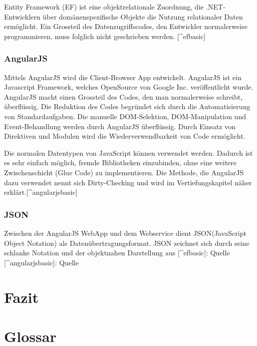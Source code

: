 Entity Framework (EF) ist eine objektrelationale Zuordnung, die
.NET-Entwicklern über domänenspezifische Objekte die Nutzung
relationaler Daten ermöglicht. Ein Grossteil des Datenzugriffscodes, den
Entwickler normalerweise programmieren, muss folglich nicht geschrieben
werden. {[}\^{}efbasic{]}

\subsection{AngularJS}\label{angularjs}

Mittels AngularJS wird die Client-Browser App entwickelt. AngularJS ist
ein Javascript Framework, welches OpenSource von Google Inc.
veröffentlicht wurde. AngularJS macht einen Grossteil des Codes, den man
normalerweise schreibt, überflüssig. Die Reduktion des Codes begründet
sich durch die Automatisierung von Standardaufgaben. Die manuelle
DOM-Selektion, DOM-Manipulation und Event-Behandlung werden durch
AngularJS überflüssig. Durch Einsatz von Direktiven und Modulen wird die
Wiederverwendbarkeit von Code ermöglicht.

Die normalen Datentypen von JavaScript können verwendet werden. Dadurch
ist es sehr einfach möglich, fremde Bibliotheken einzubinden, ohne eine
weitere Zwischenschicht (Glue Code) zu implementieren. Die Methode, die
AngularJS dazu verwendet nennt sich Dirty-Checking und wird im
Vertiefungskapitel näher erklärt.{[}\^{}angularjsbasic{]}

\subsection{JSON}\label{json}

Zwischen der AngularJS WebApp und dem Webservice dient JSON(JavaScript
Object Notation) als Datenübertragungsformat. JSON zeichnet sich durch
seine schlanke Notation und der objektnahen Darstellung aus
{[}\^{}efbasic{]}: Quelle \autocite{efbasic} {[}\^{}angularjsbasic{]}:
Quelle \autocite{angularjsbasic}

\chapter{Fazit}\label{fazit-1}

\newpage

\appendix

\hypertarget{glossar}{\chapter{Glossar}\label{glossar}}

